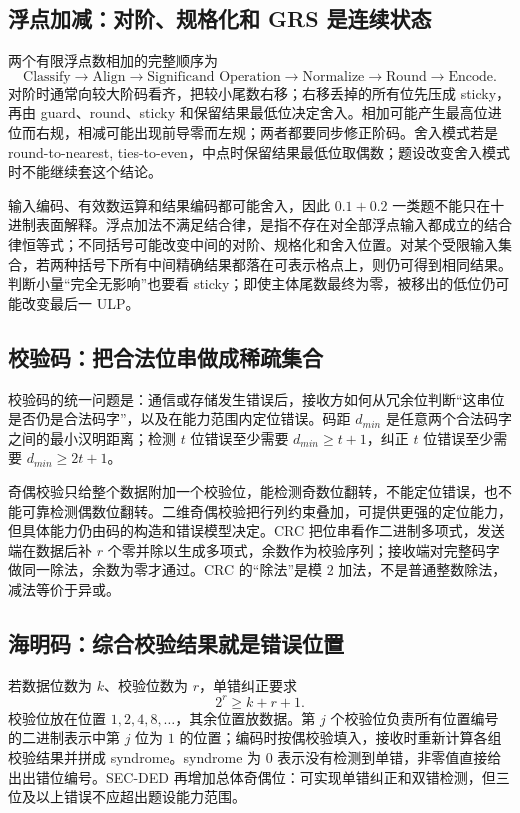\documentclass[UTF8,fontset=fandol,11pt,a4paper]{ctexart}
\begin{document}
\subsection{浮点加减：对阶、规格化和 GRS 是连续状态}

两个有限浮点数相加的完整顺序为
\[
\text{Classify}\to\text{Align}\to\text{Significand Operation}
\to\text{Normalize}\to\text{Round}\to\text{Encode}.
\]
对阶时通常向较大阶码看齐，把较小尾数右移；右移丢掉的所有位先压成 sticky，再由 guard、round、sticky 和保留结果最低位决定舍入。相加可能产生最高位进位而右规，相减可能出现前导零而左规；两者都要同步修正阶码。舍入模式若是 round-to-nearest, ties-to-even，中点时保留结果最低位取偶数；题设改变舍入模式时不能继续套这个结论。

输入编码、有效数运算和结果编码都可能舍入，因此 $0.1+0.2$ 一类题不能只在十进制表面解释。浮点加法不满足结合律，是指不存在对全部浮点输入都成立的结合律恒等式；不同括号可能改变中间的对阶、规格化和舍入位置。对某个受限输入集合，若两种括号下所有中间精确结果都落在可表示格点上，则仍可得到相同结果。判断小量“完全无影响”也要看 sticky；即使主体尾数最终为零，被移出的低位仍可能改变最后一 ULP。

\subsection{校验码：把合法位串做成稀疏集合}

校验码的统一问题是：通信或存储发生错误后，接收方如何从冗余位判断“这串位是否仍是合法码字”，以及在能力范围内定位错误。码距 $d_{min}$ 是任意两个合法码字之间的最小汉明距离；检测 $t$ 位错误至少需要 $d_{min}\ge t+1$，纠正 $t$ 位错误至少需要 $d_{min}\ge2t+1$。

奇偶校验只给整个数据附加一个校验位，能检测奇数位翻转，不能定位错误，也不能可靠检测偶数位翻转。二维奇偶校验把行列约束叠加，可提供更强的定位能力，但具体能力仍由码的构造和错误模型决定。CRC 把位串看作二进制多项式，发送端在数据后补 $r$ 个零并除以生成多项式，余数作为校验序列；接收端对完整码字做同一除法，余数为零才通过。CRC 的“除法”是模 $2$ 加法，不是普通整数除法，减法等价于异或。

\subsection{海明码：综合校验结果就是错误位置}

若数据位数为 $k$、校验位数为 $r$，单错纠正要求
\[
2^r\ge k+r+1.
\]
校验位放在位置 $1,2,4,8,\ldots$，其余位置放数据。第 $j$ 个校验位负责所有位置编号的二进制表示中第 $j$ 位为 $1$ 的位置；编码时按偶校验填入，接收时重新计算各组校验结果并拼成 syndrome。syndrome 为 $0$ 表示没有检测到单错，非零值直接给出出错位编号。SEC-DED 再增加总体奇偶位：可实现单错纠正和双错检测，但三位及以上错误不应超出题设能力范围。
\end{document}
